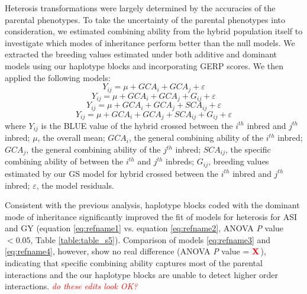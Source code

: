 \documentclass[9pt,twocolumn,twoside]{gsajnl}
\newcommand{\X}{\textcolor{red}{\bf X\,}}
\newcommand{\jri}[1]{\textcolor{red}{ \emph{ #1}} }
\begin{document}
Heterosis transformations were largely determined by the accuracies of the parental phenotypes. 
To take the uncertainty of the parental phenotypes into consideration, we estimated  combining ability from the hybrid population itself to investigate which modes of inheritance perform better than the null models. 
We extracted the breeding values estimated under both additive and dominant models using our haplotype blocks and incorporating GERP scores. 
We then applied the following models:
\begin{equation}
Y_{ij} = \mu + GCA_{i} + GCA_{j} + \varepsilon
\label{eq:refname1}
\end{equation}
\begin{equation}
Y_{ij} = \mu + GCA_{i} + GCA_{j} +  G_{ij} + \varepsilon
\label{eq:refname2}
\end{equation}
\begin{equation}
Y_{ij} = \mu + GCA_{i} + GCA_{j} + SCA_{ij} + \varepsilon
\label{eq:refname3}
\end{equation}
\begin{equation}
Y_{ij} = \mu + GCA_{i} + GCA_{j} + SCA_{ij} + G_{ij} + \varepsilon
\label{eq:refname4}
\end{equation}
where 
$Y_{ij}$ is the BLUE value of the hybrid crossed between the $i^{th}$ inbred and $j^{th}$ inbred; 
$\mu$, the overall mean; 
$GCA_{i}$, the general combining ability of the $i^{th}$ inbred;
$GCA_{j}$, the general combining ability of the $j^{th}$ inbred;
$SCA_{ij}$, the specific combining ability of between the $i^{th}$ and $j^{th}$ inbreds;
$G_{ij}$, breeding values estimated by our GS model for hybrid crossed between the $i^{th}$ inbred and $j^{th}$ inbred; 
$\varepsilon$, the model residuals.

Consistent with the previous analysis, haplotype blocks coded with the dominant mode of inheritance significantly improved the fit of models for heterosis for ASI and GY (equation \ref{eq:refname1} vs. equation \ref{eq:refname2}, ANOVA \emph{P} value $<0.05$, Table \ref{table:table_s5}). 
Comparison of models \ref{eq:refname3} and \ref{eq:refname4}, however, show no real difference (ANOVA \emph{P} value = \X), indicating that   specific combining ability captures most of the parental interactions and the our haplotype blocks are unable to detect higher order interactions.   \jri{do these edits look OK?}

\end{document}

